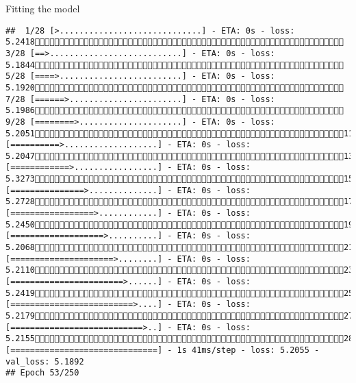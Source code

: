 \documentclass[
  ignorenonframetext,
]{beamer}
\begin{document}
\begin{frame}[fragile]{Fitting the model}
\begin{verbatim}
##  1/28 [>.............................] - ETA: 0s - loss: 5.2418 3/28 [==>...........................] - ETA: 0s - loss: 5.1844 5/28 [====>.........................] - ETA: 0s - loss: 5.1920 7/28 [======>.......................] - ETA: 0s - loss: 5.1986 9/28 [========>.....................] - ETA: 0s - loss: 5.205111/28 [==========>...................] - ETA: 0s - loss: 5.204713/28 [============>.................] - ETA: 0s - loss: 5.327315/28 [===============>..............] - ETA: 0s - loss: 5.272817/28 [=================>............] - ETA: 0s - loss: 5.245019/28 [===================>..........] - ETA: 0s - loss: 5.206821/28 [=====================>........] - ETA: 0s - loss: 5.211023/28 [=======================>......] - ETA: 0s - loss: 5.241925/28 [=========================>....] - ETA: 0s - loss: 5.217927/28 [===========================>..] - ETA: 0s - loss: 5.215528/28 [==============================] - 1s 41ms/step - loss: 5.2055 - val_loss: 5.1892
## Epoch 53/250

\end{verbatim}
\end{frame}
\end{document}
